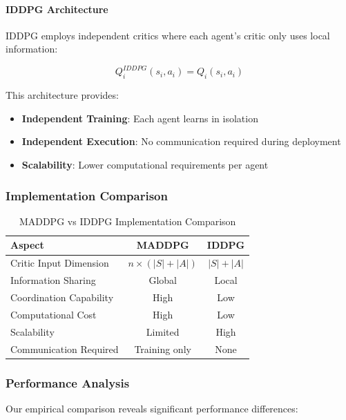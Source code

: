 \documentclass[conference]{IEEEtran}
\begin{document}
{{\paragraph{IDDPG Architecture}

IDDPG employs independent critics where each agent's critic only uses local information:

\begin{equation}
Q_i^{IDDPG}(s_i, a_i) = Q_i(s_i, a_i)
\end{equation}

This architecture provides:
\begin{itemize}
    \item \textbf{Independent Training}: Each agent learns in isolation
    \item \textbf{Independent Execution}: No communication required during deployment
    \item \textbf{Scalability}: Lower computational requirements per agent
\end{itemize}

\subsubsection{Implementation Comparison}

\begin{table}[h!]
\centering
\caption{MADDPG vs IDDPG Implementation Comparison}
\begin{tabular}{|l|c|c|}
\hline
\textbf{Aspect} & \textbf{MADDPG} & \textbf{IDDPG} \\
\hline
Critic Input Dimension & $n \times (|S| + |A|)$ & $|S| + |A|$ \\
Information Sharing & Global & Local \\
Coordination Capability & High & Low \\
Computational Cost & High & Low \\
Scalability & Limited & High \\
Communication Required & Training only & None \\
\hline
\end{tabular}
\label{tab:maddpg_vs_iddpg}
\end{table}

\subsubsection{Performance Analysis}

Our empirical comparison reveals significant performance differences:

}}
\end{document}
